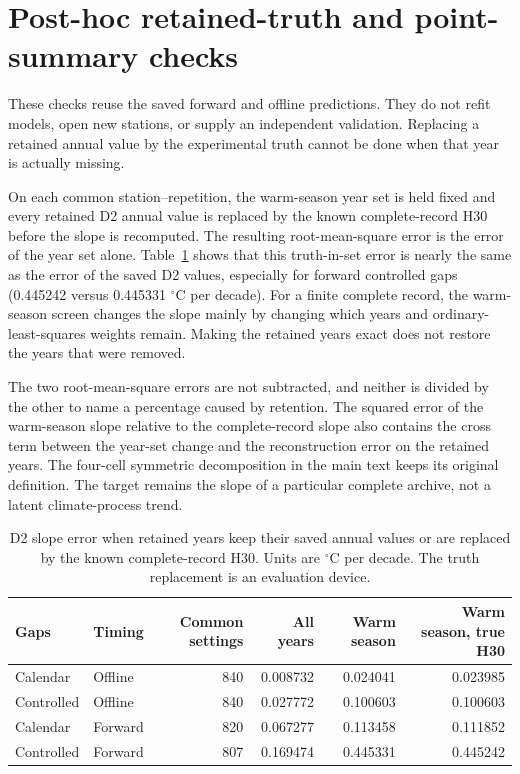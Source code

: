 \section{Post-hoc retained-truth and point-summary checks}
These checks reuse the saved forward and offline predictions. They do not refit models, open new stations, or supply an independent validation. Replacing a retained annual value by the experimental truth cannot be done when that year is actually missing.

On each common station--repetition, the warm-season year set is held fixed and every retained D2 annual value is replaced by the known complete-record H30 before the slope is recomputed. The resulting root-mean-square error is the error of the year set alone. Table~\ref{tab:retained-truth} shows that this truth-in-set error is nearly the same as the error of the saved D2 values, especially for forward controlled gaps (0.445242 versus 0.445331 $^{\circ}$C per decade). For a finite complete record, the warm-season screen changes the slope mainly by changing which years and ordinary-least-squares weights remain. Making the retained years exact does not restore the years that were removed.

The two root-mean-square errors are not subtracted, and neither is divided by the other to name a percentage caused by retention. The squared error of the warm-season slope relative to the complete-record slope also contains the cross term between the year-set change and the reconstruction error on the retained years. The four-cell symmetric decomposition in the main text keeps its original definition. The target remains the slope of a particular complete archive, not a latent climate-process trend.

\begin{table}[p]
\caption{D2 slope error when retained years keep their saved annual values or are replaced by the known complete-record H30. Units are $^{\circ}$C per decade. The truth replacement is an evaluation device.}
\label{tab:retained-truth}
\centering
\footnotesize
\begin{tabular}{llrrrr}
\toprule
Gaps & Timing & Common settings & All years & Warm season & Warm season, true H30 \\
\midrule
Calendar & Offline & 840 & 0.008732 & 0.024041 & 0.023985 \\
Controlled & Offline & 840 & 0.027772 & 0.100603 & 0.100603 \\
Calendar & Forward & 820 & 0.067277 & 0.113458 & 0.111852 \\
Controlled & Forward & 807 & 0.169474 & 0.445331 & 0.445242 \\
\bottomrule
\end{tabular}
\end{table}


